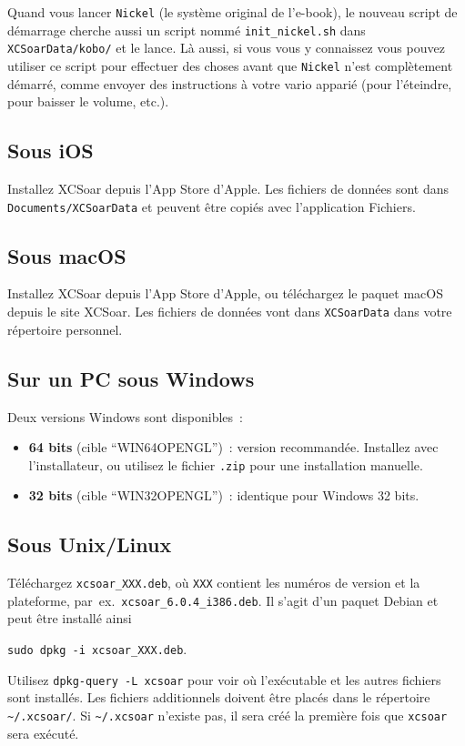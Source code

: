 Quand vous lancer \texttt{Nickel} (le système original de l'e-book), le nouveau
script de démarrage cherche aussi un script nommé \texttt{init\_nickel.sh}
dans \texttt{XCSoarData/kobo/} et le lance. Là aussi, si 
vous vous y connaissez vous pouvez utiliser ce script pour effectuer des choses
avant que \texttt{Nickel} n'est complètement démarré, comme envoyer des instructions
à votre vario apparié (pour l'éteindre, pour baisser le volume, etc.).

\subsection*{Sous iOS}

Installez XCSoar depuis l'App Store d'Apple. Les fichiers de données sont
dans \texttt{Documents/XCSoarData} et peuvent être copiés avec l'application
Fichiers.

\subsection*{Sous macOS}

Installez XCSoar depuis l'App Store d'Apple, ou téléchargez le paquet macOS
depuis le site XCSoar. Les fichiers de données vont dans \texttt{XCSoarData}
dans votre répertoire personnel.

\subsection*{Sur un PC sous Windows}

Deux versions Windows sont disponibles~:
\begin{itemize}
\item \textbf{64 bits} (cible ``WIN64OPENGL'')~: version recommandée.
  Installez avec l'installateur, ou utilisez le fichier \verb|.zip|
  pour une installation manuelle.
\item \textbf{32 bits} (cible ``WIN32OPENGL'')~: identique pour Windows
  32 bits.
\end{itemize}

\subsection*{Sous Unix/Linux}

Téléchargez \verb|xcsoar_XXX.deb|, où \verb|XXX| contient les numéros de version et la plateforme, par~ex.\ \verb|xcsoar_6.0.4_i386.deb|.
Il s'agit d'un paquet Debian et peut être installé ainsi 
\begin{center}
\verb|sudo dpkg -i xcsoar_XXX.deb|.
\end{center}
Utilisez \verb|dpkg-query -L xcsoar| pour voir où l'exécutable et les autres fichiers sont installés.
Les fichiers additionnels doivent être placés dans le répertoire
\verb|~/.xcsoar/|.
Si \verb|~/.xcsoar| n'existe pas, il sera créé la première fois que \verb|xcsoar| sera exécuté.

